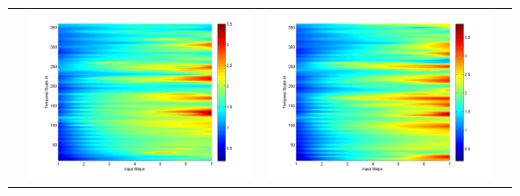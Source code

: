 \documentclass[11pt]{article}
\begin{document}
\begin{table}[H]
{\begin{tabular}{c  c   c   c  }
&\begin{minipage}{.3\textwidth}\includegraphics[width=\linewidth]{resultgraph/02472000pep.png}\end{minipage}
&\begin{minipage}{.3\textwidth}\includegraphics[width=\linewidth]{resultgraph/02472000pepq.png}\end{minipage}
\\

\end{tabular}}
\end{table}
\end{document}
